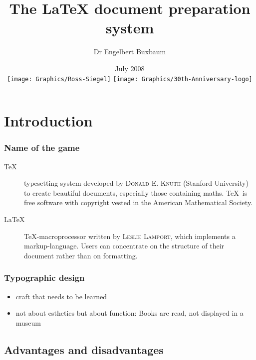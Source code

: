 \documentclass[presentation,hideothersubsections,final,10pt]{beamer}
\title{The \alert{\LaTeX} document preparation system}
\institute{Department of Biochemistry, RUSM}
\author{Dr Engelbert Buxbaum}
\date{July 2008 \vspace{5mm}\\
    \texttt{[image: Graphics/Ross-Siegel]}\hspace{5mm}
    \texttt{[image: Graphics/30th-Anniversary-logo]}
    }
\begin{document}
  {%
    \insertframenumber
  }

\frame{\titlepage}

\section{Introduction}

\begin{frame}
  \frametitle{Name of the game}
  \begin{description}
    \item[\TeX]{typesetting system developed by
        \textsc{Donald E. Knuth} (Stanford University) to
        create beautiful documents, especially those
        containing maths. \TeX\ is free software with
        copyright vested in the American Mathematical
        Society.}
    \item[\LaTeX]{\TeX -macroprocessor written by \textsc{Leslie
        Lamport}, which implements a markup-language. Users can
        concentrate on the structure of their document rather than on
        formatting.}
  \end{description}
\end{frame}

\begin{frame}
  \frametitle{Typographic design}
  \begin{itemize}
    \item{craft that needs to be learned}
    \item{not about esthetics but about function: Books are
        read, not displayed in a museum}
  \end{itemize}
\end{frame}

\subsection{Advantages and disadvantages}
\end{document}

